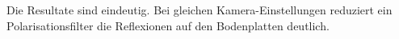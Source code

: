 \documentclass[../main.tex]{subfiles}
\begin{document}
Die Resultate sind eindeutig. Bei gleichen Kamera-Einstellungen reduziert ein Polarisationsfilter die Reflexionen auf den Bodenplatten deutlich.


\addtocounter{subsection}{1}



\end{document}
